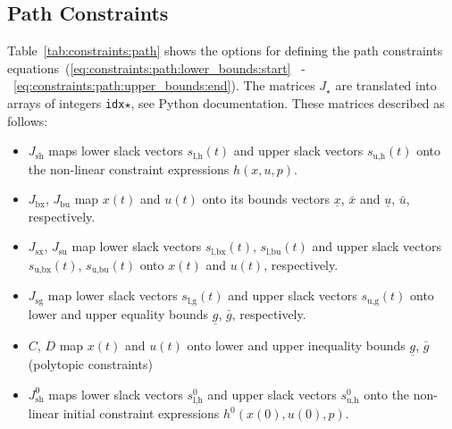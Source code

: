 \documentclass[english]{article}
\newcommand{\ind}[1]{_{\textrm{#1}}}
\newcommand{\initial}{^{\textrm{0}}}
\begin{document}
\subsection{Path Constraints}\label{sec:constraints:path}
%
Table~\ref{tab:constraints:path} shows the options for defining the path constraints equations~(\ref{eq:constraints:path:lower_bounds:start} ~-~\ref{eq:constraints:path:upper_bounds:end}).
The matrices $ J_{\star} $ are translated into arrays of integers \texttt{idx}$\star$, see Python documentation.
These matrices described as follows:
\begin{itemize}
    \item $J\ind{sh}$ maps lower slack vectors $s\ind{l,h}(t)$ and upper slack vectors $s\ind{u,h}(t)$ onto the non-linear constraint expressions $h(x,u,p)$.
    \item $J\ind{bx}$, $J\ind{bu}$ map $x(t)$ and $u(t)$ onto its bounds vectors $\underline{x}$, $\bar{x}$ and $\underline{u}$, $\bar{u}$, respectively.
    \item $J\ind{sx}$, $J\ind{su}$ map lower slack vectors $s\ind{l,bx}(t)$, $s\ind{l,bu}(t)$ and upper slack vectors $s\ind{u,bx}(t)$, $s\ind{u,bu}(t)$ onto $x(t)$ and $u(t)$, respectively.
    \item $J\ind{sg}$ map lower slack vectors $s\ind{l,g}(t)$ and upper slack vectors $s\ind{u,g}(t)$ onto lower and upper equality bounds $\underline{g}$, $\bar{g}$, respectively.
    \item $C$, $D$ map $x(t)$ and $u(t)$ onto lower and upper inequality bounds $\underline{g}$, $\bar{g}$ (polytopic constraints)
    \item $J\ind{sh}\initial$ maps lower slack vectors $s\ind{l,h}\initial$ and upper slack vectors $s\ind{u,h}\initial$ onto the non-linear initial constraint expressions $h\initial(x(0),u(0),p)$.
\end{itemize}
%
\end{document}
